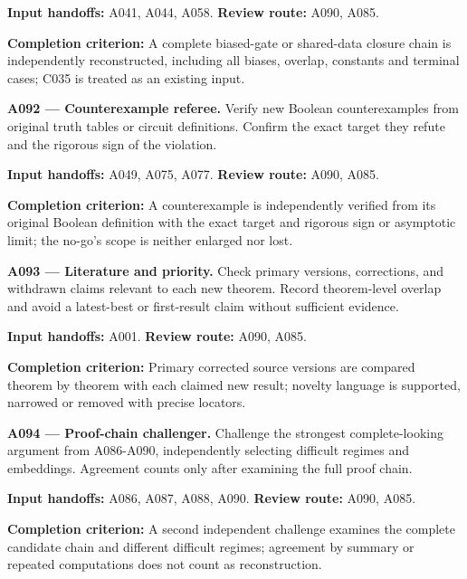 \documentclass[11pt]{article}
\begin{document}
{\small\color{ink}\textbf{Input handoffs:} A041, A044, A058. \textbf{Review route:} A090, A085.\par
\textbf{Completion criterion:} A complete biased-gate or shared-data closure chain is independently reconstructed, including all biases, overlap, constants and terminal cases; C035 is treated as an existing input.\par}



\textbf{A092 --- Counterexample referee.} Verify new Boolean counterexamples from original truth tables or circuit definitions. Confirm the exact target they refute and the rigorous sign of the violation.

{\small\color{ink}\textbf{Input handoffs:} A049, A075, A077. \textbf{Review route:} A090, A085.\par
\textbf{Completion criterion:} A counterexample is independently verified from its original Boolean definition with the exact target and rigorous sign or asymptotic limit; the no-go's scope is neither enlarged nor lost.\par}



\textbf{A093 --- Literature and priority.} Check primary versions, corrections, and withdrawn claims relevant to each new theorem. Record theorem-level overlap and avoid a latest-best or first-result claim without sufficient evidence.

{\small\color{ink}\textbf{Input handoffs:} A001. \textbf{Review route:} A090, A085.\par
\textbf{Completion criterion:} Primary corrected source versions are compared theorem by theorem with each claimed new result; novelty language is supported, narrowed or removed with precise locators.\par}



\textbf{A094 --- Proof-chain challenger.} Challenge the strongest complete-looking argument from A086-A090, independently selecting difficult regimes and embeddings. Agreement counts only after examining the full proof chain.

{\small\color{ink}\textbf{Input handoffs:} A086, A087, A088, A090. \textbf{Review route:} A090, A085.\par
\textbf{Completion criterion:} A second independent challenge examines the complete candidate chain and different difficult regimes; agreement by summary or repeated computations does not count as reconstruction.\par}
\end{document}
